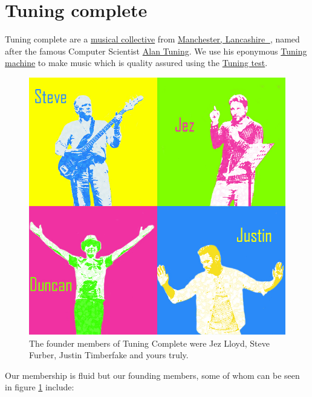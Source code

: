 \documentclass[
  12pt,
]{book}
\begin{document}
\hypertarget{tuningcomplete}{%
\section{Tuning complete}\label{tuningcomplete}}

Tuning complete are a \href{https://en.wikipedia.org/wiki/Musical_collective}{musical collective} from \href{https://duncan.hull.name/2019/07/05/mancashire/}{Manchester, Lancashire 🌹}, named after the famous Computer Scientist \href{https://en.wikipedia.org/wiki/Alan_Turing}{Alan Tuning}. We use his eponymous \href{https://en.wikipedia.org/wiki/Turing_machine}{Tuning machine} to make music which is quality assured using the \href{https://en.wikipedia.org/wiki/Turing_test}{Tuning test}.

\begin{figure}

{\centering \includegraphics[width=0.7\linewidth]{images/tuning-complete} 

}

\caption{The founder members of Tuning Complete were Jez Lloyd, Steve Furber, Justin Timberfake and yours truly.}\label{fig:beatles-fig}
\end{figure}

Our membership is fluid but our founding members, some of whom can be seen in figure \ref{fig:beatles-fig} include:
\end{document}
